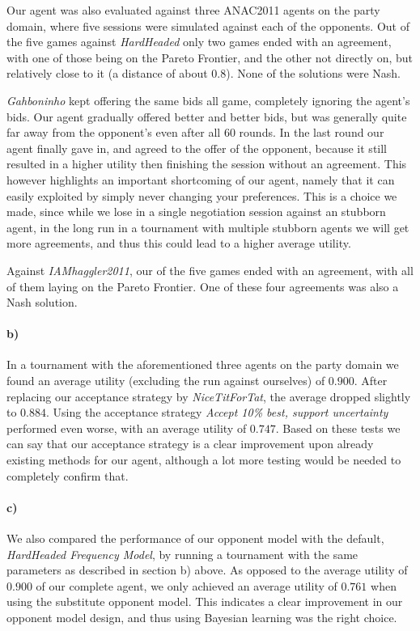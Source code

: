 \documentclass{article}
\begin{document}
\begin{enumerate}
Our agent was also evaluated against three ANAC2011 agents on the party domain, where five sessions were simulated against each of the opponents.
Out of the five games against \textit{HardHeaded} only two games ended with an agreement, with one of those being on the Pareto Frontier, and the other not directly on, but relatively close to it (a distance of about $0.8$). None of the solutions were Nash. 

\textit{Gahboninho} kept offering the same bids all game, completely ignoring the agent's bids. Our agent gradually offered better and better bids, but was generally quite far away from the opponent's even after all $60$ rounds. In the last round our agent finally gave in, and agreed to the offer of the opponent, because it still resulted in a higher utility then finishing the session without an agreement. This however highlights an important shortcoming of our agent, namely that it can easily exploited by simply never changing your preferences. This is a choice we made, since while we lose in a single negotiation session against an stubborn agent, in the long run in a tournament with multiple stubborn agents we will get more agreements, and thus this could lead to a higher average utility.

Against \textit{IAMhaggler2011}, our of the five games ended with an agreement, with all of them laying on the Pareto Frontier. One of these four agreements was also a Nash solution.

\paragraph{b)}In a tournament with the aforementioned three agents on the party domain we found an average utility (excluding the run against ourselves) of $0.900$. After replacing our acceptance strategy by \textit{NiceTitForTat}, the average dropped slightly to $0.884$. Using the acceptance strategy \textit{Accept 10\% best, support uncertainty} performed even worse, with an average utility of $0.747$. Based on these tests we can say that our acceptance strategy is a clear improvement upon already existing methods for our agent, although a lot more testing would be needed to completely confirm that. 

\paragraph{c)}We also compared the performance of our opponent model with the default, \textit{HardHeaded Frequency Model}, by running a tournament with the same parameters as described in section b) above. As opposed to the average utility of $0.900$ of our complete agent, we only achieved an average utility of $0.761$ when using the substitute opponent model. This indicates a clear improvement in our opponent model design, and thus using Bayesian learning was the right choice.


\end{enumerate}
\end{document}
